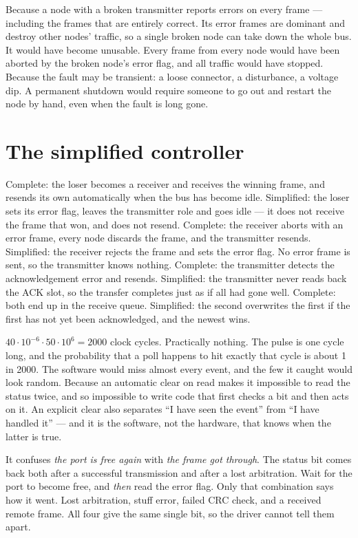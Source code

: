  Because a node with a broken transmitter reports errors on every frame --- including the
frames that are entirely correct. Its error frames are dominant and destroy other nodes' traffic, so
a single broken node can take down the whole bus.
 It would have become unusable. Every frame from every node would have been aborted by the
broken node's error flag, and all traffic would have stopped.
 Because the fault may be transient: a loose connector, a disturbance, a voltage dip. A
permanent shutdown would require someone to go out and restart the node by hand, even when the fault
is long gone.

\section{The simplified controller}

 Complete: the loser becomes a receiver and receives the winning frame, and resends its own
automatically when the bus has become idle. Simplified: the loser sets its error flag, leaves the
transmitter role and goes idle --- it does not receive the frame that won, and does not resend.
 Complete: the receiver aborts with an error frame, every node discards the frame, and the
transmitter resends. Simplified: the receiver rejects the frame and sets the error flag. No error
frame is sent, so the transmitter knows nothing.
 Complete: the transmitter detects the acknowledgement error and resends. Simplified: the
transmitter never reads back the ACK slot, so the transfer completes just as if all had gone well.
 Complete: both end up in the receive queue. Simplified: the second overwrites the first if the
first has not yet been acknowledged, and the newest wins.

 $40 \cdot 10^{-6} \cdot 50 \cdot 10^{6} = 2000$ clock cycles.
 Practically nothing. The pulse is one cycle long, and the probability that a poll happens to
hit exactly that cycle is about 1 in 2000. The software would miss almost every event, and the few
it caught would look random.
 Because an automatic clear on read makes it impossible to read the status twice, and so
impossible to write code that first checks a bit and then acts on it. An explicit clear also
separates ``I have seen the event'' from ``I have handled it'' --- and it is the software, not the
hardware, that knows when the latter is true.

 It confuses \emph{the port is free again} with \emph{the frame got through}. The status bit
comes back both after a successful transmission and after a lost arbitration.
 Wait for the port to become free, and \emph{then} read the error flag. Only that combination
says how it went.
 Lost arbitration, stuff error, failed CRC check, and a received remote frame. All four give
the same single bit, so the driver cannot tell them apart.

